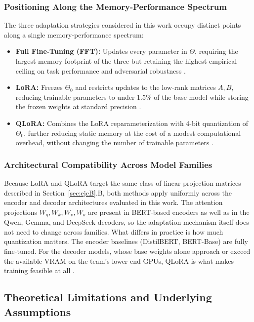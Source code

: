 \documentclass[conference]{IEEEtran}
\begin{document}
\subsubsection{Positioning Along the Memory-Performance Spectrum}
The three adaptation strategies considered in this work occupy distinct points along a single memory-performance spectrum:
\begin{itemize}
    \item \textbf{Full Fine-Tuning (FFT):} Updates every parameter in $\Theta$, requiring the largest memory footprint of the three but retaining the highest empirical ceiling on task performance and adversarial robustness \cite{liu-etal-2026-look}.
    \item \textbf{LoRA:} Freezes $\Theta_0$ and restricts updates to the low-rank matrices $A, B$, reducing trainable parameters to under $1.5\%$ of the base model while storing the frozen weights at standard precision \cite{nwaiwu2025peft}.
    \item \textbf{QLoRA:} Combines the LoRA reparameterization with 4-bit quantization of $\Theta_0$, further reducing static memory at the cost of a modest computational overhead, without changing the number of trainable parameters \cite{wang2025peft}.
\end{itemize}

\subsubsection{Architectural Compatibility Across Model Families}
Because LoRA and QLoRA target the same class of linear projection matrices described in Section~\ref{sec:ejeB}.B, both methods apply uniformly across the encoder and decoder architectures evaluated in this work. The attention projections $W_q, W_k, W_v, W_o$ are present in BERT-based encoders as well as in the Qwen, Gemma, and DeepSeek decoders, so the adaptation mechanism itself does not need to change across families. What differs in practice is how much quantization matters. The encoder baselines (DistilBERT, BERT-Base) are fully fine-tuned. For the decoder models, whose base weights alone approach or exceed the available VRAM on the team's lower-end GPUs, QLoRA is what makes training feasible at all \cite{wang2025peft}.

\subsection{Theoretical Limitations and Underlying Assumptions}
\end{document}
